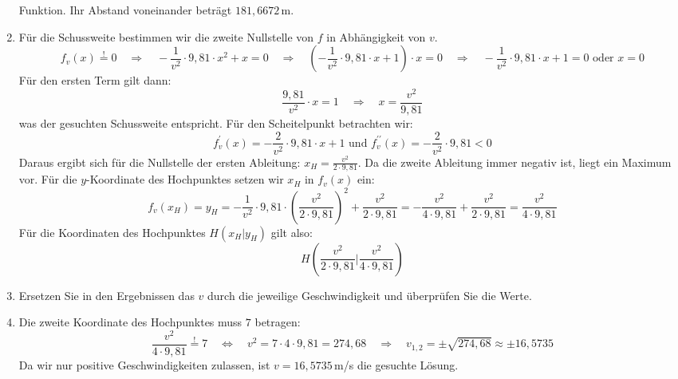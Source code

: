 \documentclass[11pt,a4paper,twoside,fleqn]{article}
\begin{document}
\begin{solution}
\begin{enumerate}
    Funktion. Ihr Abstand voneinander beträgt $181,6672\,$m.
  \item Für die Schussweite bestimmen wir die zweite Nullstelle von
    $f$ in Abhängigkeit von $v$.
    $$f_v(x) \overset{!}{=} 0
    \quad \Rightarrow\quad 
    -\frac 1 {v^2} \cdot 9,81\cdot x^2 + x=0
    \quad \Rightarrow\quad 
    (-\frac 1 {v^2} \cdot 9,81\cdot x + 1)\cdot x=0
    \quad \Rightarrow\quad 
    -\frac 1 {v^2} \cdot 9,81\cdot x + 1 = 0 \textrm{ oder } x=0$$
    Für den ersten Term gilt dann:
    $$\frac {9,81} {v^2} \cdot x = 1 
    \quad\Rightarrow\quad
     x = \frac{v^2}{9,81} $$
     was der gesuchten Schussweite entspricht.
     Für den Scheitelpunkt betrachten wir:
     $$f^\prime_v(x)= - \frac 2 {v^2} \cdot 9,81 \cdot x + 1
     \textrm{ und }
     f^{\prime\prime}_v(x)= - \frac 2 {v^2} \cdot 9,81 <0$$
     Daraus ergibt sich für die Nullstelle der ersten Ableitung:
     $x_H= \frac {v^2}{ 2\cdot 9,81}$. Da die zweite Ableitung immer
     negativ ist, liegt ein Maximum vor. Für die $y$-Koordinate des
     Hochpunktes setzen wir $x_H$ in $f_v(x)$ ein:
     $$f_v(x_H)=y_H=
     -\frac 1 {v^2} \cdot 9,81\cdot 
     ( \frac {v^2}{ 2\cdot 9,81})^2 + \frac {v^2}{ 2\cdot 9,81} =
     -\frac {v^2}{4\cdot 9,81} +\frac {v^2}{ 2\cdot 9,81}
     = \frac {v^2}{ 4\cdot 9,81}
     $$
     Für die Koordinaten des Hochpunktes $H(x_H|y_H)$ gilt also:
     $$H\left(\frac {v^2}{ 2\cdot 9,81}\Big|\frac {v^2}{ 4\cdot 9,81}\right) $$
   \item Ersetzen Sie in den Ergebnissen das $v$ durch die jeweilige
     Geschwindigkeit und überprüfen Sie die Werte.
   \item Die zweite Koordinate des Hochpunktes muss $7$ betragen:
     $$\frac {v^2}{ 4\cdot 9,81} \overset{!}{=}7   
     \quad\Leftrightarrow\quad
     v^2 =7\cdot 4\cdot 9,81 = 274,68
     \quad\Rightarrow\quad
     v_{1,2}=\pm \sqrt{274,68}\approx\pm16,5735
     $$
     Da wir nur positive Geschwindigkeiten zulassen, ist
     $v=16,5735\,$m/s die gesuchte Lösung.
  \end{enumerate}
\end{solution}
\end{document}
